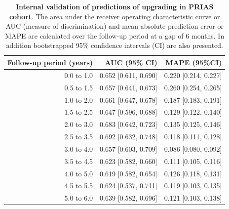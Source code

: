 \begin{table}[!htb]
\small\sf\centering
\caption{\textbf{Internal validation of predictions of upgrading in PRIAS cohort}. The area under the receiver operating characteristic curve or AUC (measure of discrimination) and mean absolute prediction error or MAPE are calculated over the follow-up period at a gap of 6 months. In addition bootstrapped 95\% confidence intervals (CI) are also presented.}
\label{tab:AUC_PE_PRIAS}
\begin{tabular}{r|r|r}
\hline
\hline
Follow-up period (years) & AUC (95\% CI) & MAPE (95\%CI)\\ 
\hline
0.0 to 1.0 & 0.652 [0.611, 0.690] & 0.220 [0.214, 0.227]\\
0.5 to 1.5 & 0.657 [0.641, 0.673] & 0.260 [0.254, 0.265]\\
1.0 to 2.0 & 0.661 [0.647, 0.678] & 0.187 [0.183, 0.191]\\
1.5 to 2.5 & 0.647 [0.596, 0.688] & 0.129 [0.122, 0.140]\\
2.0 to 3.0 & 0.683 [0.642, 0.723] & 0.135 [0.125, 0.146]\\
2.5 to 3.5 & 0.692 [0.632, 0.748] & 0.118 [0.111, 0.128]\\
3.0 to 4.0 & 0.657 [0.603, 0.709] & 0.086 [0.080, 0.092]\\
3.5 to 4.5 & 0.623 [0.582, 0.660] & 0.111 [0.105, 0.116]\\
4.0 to 5.0 & 0.619 [0.582, 0.654] & 0.126 [0.118, 0.131]\\
4.5 to 5.5 & 0.624 [0.537, 0.711] & 0.119 [0.103, 0.135]\\
5.0 to 6.0 & 0.639 [0.582, 0.696] & 0.121 [0.103, 0.138]\\
\hline
\end{tabular}    
\end{table}

